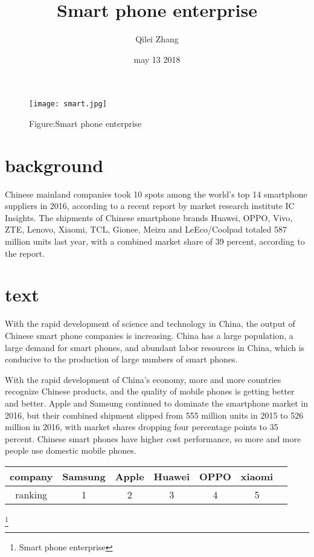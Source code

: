 \documentclass[10pt]{article}
\begin{document}
\title{Smart phone enterprise}
\author{Qilei Zhang}
\date{may 13 2018}
\maketitle
\par
\begin{figure}[htbp]
\small
\centering
\texttt{[image: smart.jpg]}
\caption{Figure:Smart phone enterprise}
\label{fig:lable}
\end{figure}
\par
\section{background}
Chinese mainland companies took 10 spots among the world's top 14 smartphone suppliers in 2016, according to a recent report by market research institute IC Insights. The shipments of Chinese smartphone brands Huawei, OPPO, Vivo, ZTE, Lenovo, Xiaomi, TCL, Gionee, Meizu and LeEco/Coolpad totaled 587 million units last year, with a combined market share of 39 percent, according to the report.\cite{higham1994bibtex}
\par
\section{text}
With the rapid development of science and technology in China, the output of Chinese smart phone companies is increasing. China has a large population, a large demand for smart phones, and abundant labor resources in China, which is conducive to the production of large numbers of smart phones.\cite{h1994bibtex}
\par
With the rapid development of China's economy, more and more countries recognize Chinese products, and the quality of mobile phones is getting better and better. Apple and Samsung continued to dominate the smartphone market in 2016, but their combined shipment slipped from 555 million units in 2015 to 526 million in 2016, with market shares dropping four percentage points to 35 percent. Chinese smart phones have higher cost performance, so more and more people use domestic mobile phones.\\
\par
\begin{tabular}{|c|c|c|c|c|c|p{20em}}
\hline
company  & Samsung & Apple & Huawei&OPPO&xiaomi\\
\hline
ranking  &   1     &  2    &   3   & 4  &  5\\
\hline
\end{tabular}

\footnote{\centering Smart phone enterprise}
\end{document}
